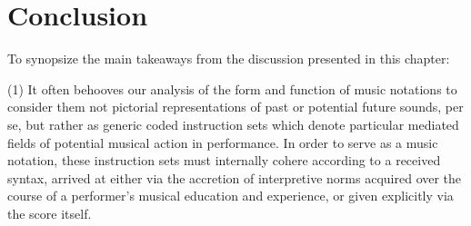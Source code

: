 



    

\section{Conclusion}

To synopsize the main takeaways from the discussion presented in this chapter:

(1) It often behooves our analysis of the form and function of music notations to consider them not pictorial representations of past or potential future sounds, per se, but rather as generic coded instruction sets which denote particular mediated fields of potential musical action in performance. In order to serve as a music notation, these instruction sets must internally cohere according to a received syntax, arrived at either via the accretion of interpretive norms acquired over the course of a performer's musical education and experience, or given explicitly via the score itself.

